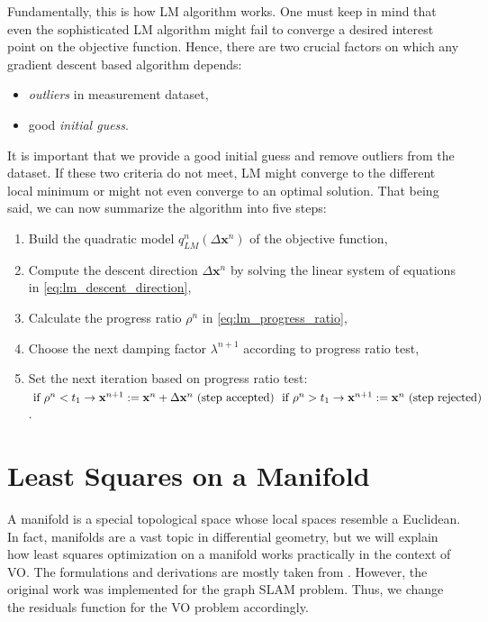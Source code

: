 \documentclass[12pt]{report}
\numberwithin{figure}{section}
\begin{document}
\begin{appendices}
Fundamentally, this is how LM algorithm works. 
One must keep in mind that even the sophisticated LM algorithm might fail to 
converge a desired interest point on the objective function. Hence, 
there are two crucial factors on which any gradient descent based algorithm depends:
\begin{itemize}
  \item \textit{outliers} in measurement dataset,
  \item good \textit{initial guess}. 
\end{itemize}

It is important that we provide a good initial
guess and remove outliers from the dataset. 
If these two criteria do not meet, LM might converge to the
different local minimum or might not even converge to
an optimal solution. 
That being said, we can now summarize the algorithm into five steps:

\begin{enumerate}
  \item Build the quadratic model $q_{LM}^n(\Delta \mathbf{x}^n)$ of the objective function,
  \item Compute the descent direction $\Delta \mathbf{x}^n$ by solving the linear system of 
    equations in \eqref{eq:lm_descent_direction},
  \item Calculate the progress ratio $\rho^n$ in \eqref{eq:lm_progress_ratio},
  \item Choose the next damping factor $\lambda^{n+1}$ according to progress ratio test,
  \item Set the next iteration based on progress ratio test:
    $\\ \text{  if } \rho^n < t_1 \rightarrow \mathbf{x}^{n+1}:=\mathbf{x}^n +\Delta \mathbf{x}^n \text{ (step accepted) }\\ 
    \text{  if }\rho^n > t_1 \rightarrow \mathbf{x}^{n+1}:=\mathbf{x}^n \text{ (step rejected)}$.
\end{enumerate}



\section{Least Squares on a Manifold}\label{sc_lsq_manifold}

A manifold is a special topological space whose local spaces resemble a 
Euclidean.
In fact, manifolds are a vast topic in differential geometry, but
we will explain how least squares optimization on 
a manifold works practically in the context of VO. The formulations and 
derivations are mostly taken from \parencite{Sol2016}. However, 
the original work was implemented for the graph SLAM problem. Thus, 
we change the residuals function for the VO problem accordingly. 


\end{appendices}
\end{document}
